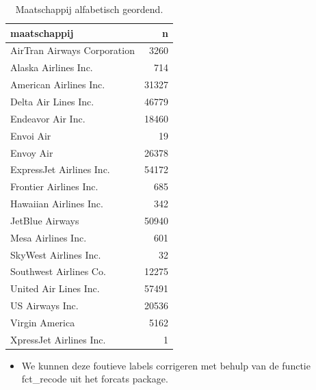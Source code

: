 \documentclass[]{tufte-book}
\newenvironment{Shaded}{}{}
\newcommand{\KeywordTok}[1]{\textcolor[rgb]{0.00,0.44,0.13}{\textbf{#1}}}
\newcommand{\NormalTok}[1]{#1}
\newcommand{\OperatorTok}[1]{\textcolor[rgb]{0.40,0.40,0.40}{#1}}
\newcommand{\StringTok}[1]{\textcolor[rgb]{0.25,0.44,0.63}{#1}}
\providecommand{\tightlist}{%
  \setlength{\itemsep}{0pt}\setlength{\parskip}{0pt}}
\begin{document}
\begin{Shaded}
\end{Shaded}

\begin{table}

\caption{\label{tab:5-6b}Maatschappij alfabetisch geordend.}
\centering
\fontsize{10}{12}\selectfont
\begin{tabular}[t]{lr}
\toprule
maatschappij & n\\
\midrule
AirTran Airways Corporation & 3260\\
Alaska Airlines Inc. & 714\\
American Airlines Inc. & 31327\\
Delta Air Lines Inc. & 46779\\
Endeavor Air Inc. & 18460\\
\addlinespace
Envoi Air & 19\\
Envoy Air & 26378\\
ExpressJet Airlines Inc. & 54172\\
Frontier Airlines Inc. & 685\\
Hawaiian Airlines Inc. & 342\\
\addlinespace
JetBlue Airways & 50940\\
Mesa Airlines Inc. & 601\\
SkyWest Airlines Inc. & 32\\
Southwest Airlines Co. & 12275\\
United Air Lines Inc. & 57491\\
\addlinespace
US Airways Inc. & 20536\\
Virgin America & 5162\\
XpressJet Airlines Inc. & 1\\
\bottomrule
\end{tabular}
\end{table}

\begin{itemize}
\tightlist
\item
  We kunnen deze foutieve labels corrigeren met behulp van de functie fct\_recode uit het forcats package.
\end{itemize}
\end{document}
